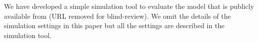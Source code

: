 
We have developed a simple simulation tool to evaluate the model
that is publicly available from (URL removed for blind-review).
We omit the details of the simulation settings in this paper but all
the settings are described in the simulation tool.




